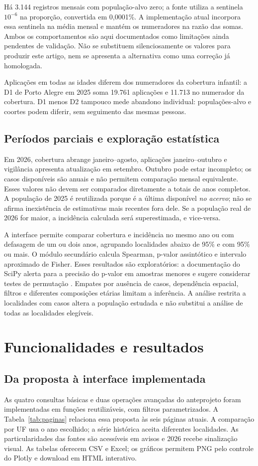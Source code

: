\documentclass[12pt]{article}
\begin{document}
Há 3.144 registros mensais com população-alvo zero; a fonte utiliza a sentinela $10^{-6}$ na proporção, convertida em 0,0001\%. A implementação atual incorpora essa sentinela na média mensal e mantém os numeradores na razão das somas. Ambos os comportamentos são aqui documentados como limitações ainda pendentes de validação. Não se substituem silenciosamente os valores para produzir este artigo, nem se apresenta a alternativa como uma correção já homologada.

Aplicações em todas as idades diferem dos numeradores da cobertura infantil: a D1 de Porto Alegre em 2025 soma 19.761 aplicações e 11.713 no numerador da cobertura. D1 menos D2 tampouco mede abandono individual: populações-alvo e coortes podem diferir, sem seguimento das mesmas pessoas.

\subsection{Períodos parciais e exploração estatística}
Em 2026, cobertura abrange janeiro--agosto, aplicações janeiro--outubro e vigilância apresenta atualização em setembro. Outubro pode estar incompleto; os casos disponíveis são anuais e não permitem comparação mensal equivalente. Esses valores não devem ser comparados diretamente a totais de anos completos. A população de 2025 é reutilizada porque é a última disponível \emph{no acervo}; não se afirma inexistência de estimativas mais recentes fora dele. Se a população real de 2026 for maior, a incidência calculada será superestimada, e vice-versa.

A interface permite comparar cobertura e incidência no mesmo ano ou com defasagem de um ou dois anos, agrupando localidades abaixo de 95\% e com 95\% ou mais. O módulo secundário calcula Spearman, p-valor assintótico e intervalo aproximado de Fisher. Esses resultados são exploratórios: a documentação do SciPy alerta para a precisão do p-valor em amostras menores e sugere considerar testes de permutação \cite{scipy}. Empates por ausência de casos, dependência espacial, filtros e diferentes composições etárias limitam a inferência. A análise restrita a localidades com casos altera a população estudada e não substitui a análise de todas as localidades elegíveis.

\section{Funcionalidades e resultados}
\subsection{Da proposta à interface implementada}
As quatro consultas básicas e duas operações avançadas do anteprojeto foram implementadas em funções reutilizáveis, com filtros parametrizados. A Tabela~\ref{tab:paginas} relaciona essa proposta às seis páginas atuais. A comparação por UF usa o ano escolhido; a série histórica aceita diferentes localidades. As particularidades das fontes são acessíveis em avisos e 2026 recebe sinalização visual. As tabelas oferecem CSV e Excel; os gráficos permitem PNG pelo controle do Plotly e download em HTML interativo.
\end{document}

